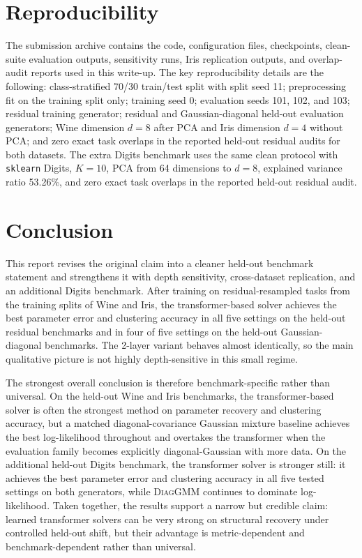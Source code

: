 \documentclass{article}
\newcommand{\diaggmm}{\textsc{DiagGMM}}
\begin{document}
\section{Reproducibility}
The submission archive contains the code, configuration files, checkpoints, clean-suite evaluation outputs, sensitivity runs, Iris replication outputs, and overlap-audit reports used in this write-up. The key reproducibility details are the following: class-stratified 70/30 train/test split with split seed 11; preprocessing fit on the training split only; training seed 0; evaluation seeds 101, 102, and 103; residual training generator; residual and Gaussian-diagonal held-out evaluation generators; Wine dimension $d=8$ after PCA and Iris dimension $d=4$ without PCA; and zero exact task overlaps in the reported held-out residual audits for both datasets. The extra Digits benchmark uses the same clean protocol with \texttt{sklearn} Digits, $K=10$, PCA from 64 dimensions to $d=8$, explained variance ratio 53.26\%, and zero exact task overlaps in the reported held-out residual audit.

\section{Conclusion}
This report revises the original claim into a cleaner held-out benchmark statement and strengthens it with depth sensitivity, cross-dataset replication, and an additional Digits benchmark. After training on residual-resampled tasks from the training splits of Wine and Iris, the transformer-based solver achieves the best parameter error and clustering accuracy in all five settings on the held-out residual benchmarks and in four of five settings on the held-out Gaussian-diagonal benchmarks. The 2-layer variant behaves almost identically, so the main qualitative picture is not highly depth-sensitive in this small regime.

The strongest overall conclusion is therefore benchmark-specific rather than universal. On the held-out Wine and Iris benchmarks, the transformer-based solver is often the strongest method on parameter recovery and clustering accuracy, but a matched diagonal-covariance Gaussian mixture baseline achieves the best log-likelihood throughout and overtakes the transformer when the evaluation family becomes explicitly diagonal-Gaussian with more data. On the additional held-out Digits benchmark, the transformer solver is stronger still: it achieves the best parameter error and clustering accuracy in all five tested settings on both generators, while \diaggmm{} continues to dominate log-likelihood. Taken together, the results support a narrow but credible claim: learned transformer solvers can be very strong on structural recovery under controlled held-out shift, but their advantage is metric-dependent and benchmark-dependent rather than universal.
\end{document}
